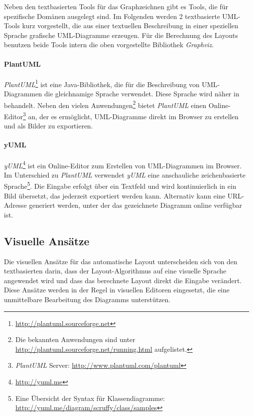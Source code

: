 Neben den textbasierten Tools für das Graphzeichnen gibt es Tools, die für spezifische Domänen ausgelegt sind. Im Folgenden werden 2 textbasierte UML-Tools kurz vorgestellt, die aus einer textuellen Beschreibung in einer speziellen Sprache grafische UML-Diagramme erzeugen. Für die Berechnung des Layouts benutzen beide Tools intern die oben vorgestellte Bibliothek \textit{Graphviz}.

\paragraph{PlantUML}


\textit{PlantUML}\footnote{\url{http://plantuml.sourceforge.net}} ist eine Java-Bibliothek, die für die Beschreibung von UML-Diagrammen die gleichnamige Sprache verwendet. Diese Sprache wird näher in \cite{Roques10Drawing} behandelt. Neben den vielen Anwendungen\footnote{Die bekannten Anwendungen sind unter \url{http://plantuml.sourceforge.net/running.html} aufgelistet.} bietet \textit{PlantUML} einen Online-Editor\footnote{\textit{PlantUML} Server: \url{http://www.plantuml.com/plantuml}} an, der es ermöglicht, UML-Diagramme direkt im Browser zu erstellen und als Bilder zu exportieren.

\paragraph{yUML}

\textit{yUML}\footnote{\url{http://yuml.me}} ist ein Online-Editor zum Erstellen von UML-Diagrammen im Browser. Im Unterschied zu \textit{PlantUML} verwendet \textit{yUML} eine anschauliche zeichenbasierte Sprache\footnote{Eine Übersicht der Syntax für Klassendiagramme: \url{http://yuml.me/diagram/scruffy/class/samples}}. Die Eingabe erfolgt über ein Textfeld und wird kontinuierlich in ein Bild übersetzt, das jederzeit exportiert werden kann. Alternativ kann eine URL-Adresse generiert \cite{Fuhrmann11On-the-Pragmatics} werden, unter der das gezeichnete Diagramm online verfügbar ist.

\subsection{Visuelle Ansätze}
\label{subsec:visual-approaches}

Die visuellen Ansätze für das automatische Layout unterscheiden sich von den textbasierten darin, dass der Layout-Algorithmus auf eine visuelle Sprache angewendet wird und dass das berechnete Layout direkt die Eingabe verändert. Diese Ansätze werden in der Regel in visuellen Editoren eingesetzt, die eine unmittelbare Bearbeitung des Diagramms unterstützen.

